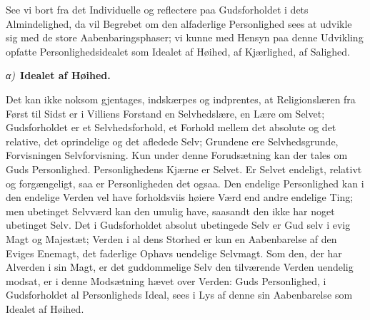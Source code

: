 \documentclass[12pt]{book}
\newcommand{\greekrun}[2]{%
  \medskip\begin{center}{\itshape #1)}\ {\bfseries #2}\end{center}\medskip}
\begin{document}
See vi bort fra det Individuelle og reflectere paa Gudsforholdet i
dets Almindelighed, da vil Begrebet om den alfaderlige Personlighed
sees at udvikle sig med de store Aabenbaringsphaser; vi kunne med
Hensyn paa denne Udvikling opfatte Personlighedsidealet som Idealet
af Høihed, af Kjærlighed, af Salighed.

\greekrun{α}{Idealet af Høihed.}

Det kan ikke noksom gjentages, indskærpes og indprentes, at
Religionslæren fra Først til Sidst er i Villiens Forstand en
Selvhedslære, en Lære om Selvet; Gudsforholdet er et
Selvhedsforhold, et Forhold mellem det absolute og det relative, det
oprindelige og det afledede Selv; Grundene ere Selvhedsgrunde,
Forvisningen Selvforvisning. Kun under denne Forudsætning kan der
tales om Guds Personlighed. Personlighedens Kjærne er Selvet. Er
Selvet endeligt, relativt og forgængeligt, saa er Personligheden det
ogsaa. Den endelige Personlighed kan i den endelige Verden vel have
forholdsviis høiere Værd
end andre endelige Ting; men ubetinget Selvværd kan den umulig have,
saasandt den ikke har noget ubetinget Selv. Det i Gudsforholdet
absolut ubetingede Selv er Gud selv i evig Magt og Majestæt; Verden
i al dens Storhed er kun en Aabenbarelse af den Eviges Enemagt, det
faderlige Ophavs uendelige Selvmagt. Som den, der har Alverden i sin
Magt, er det guddommelige Selv den tilværende Verden uendelig
modsat, er i denne Modsætning hævet over Verden: Guds Personlighed,
i Gudsforholdet al Personligheds Ideal, sees i Lys af denne sin
Aabenbarelse som Idealet af Høihed.
\end{document}
